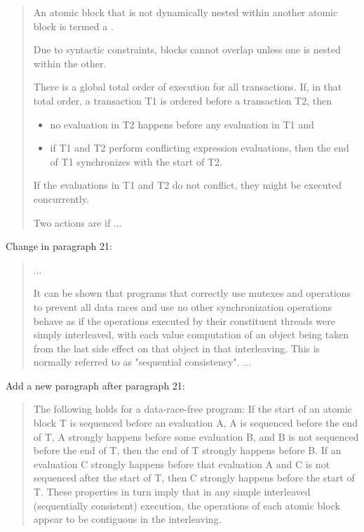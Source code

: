 \begin{quote}
\pnum
\setcounter{Paras}{20}
An atomic block that is not dynamically nested within another atomic
block is termed a .
\begin{note}
Due to syntactic constraints,
blocks cannot overlap unless one is nested within the other.
\end{note}
There is a global total order of execution for all transactions.
If, in that total order, a transaction T1 is ordered before a transaction T2,
then

\begin{itemize}
\item
  no evaluation in T2 happens before any evaluation in T1 and
\item
  if T1 and T2 perform conflicting expression evaluations, then the end
  of T1 synchronizes with the start of T2.
\end{itemize}

\begin{note}
If the evaluations in T1 and T2 do not conflict, they might be
executed concurrently.
\end{note}

\pnum
Two actions are  if ...
\end{quote}

Change in  paragraph 21:

\begin{quote}
\setcounter{Paras}{20}
\pnum
...
\begin{note}
It can be shown that programs that correctly use
mutexes and 
operations to prevent all data races and use no other synchronization
operations behave as if the operations executed by their constituent
threads were simply interleaved, with each value computation of an
object being taken from the last side effect on that object in that
interleaving. This is normally referred to as "sequential consistency".
...
\end{note}
\end{quote}

Add a new paragraph after  paragraph 21:

\begin{quote}
\setcounter{Paras}{21}
\pnum
\begin{note}
The following holds for a data-race-free program: If the start
of an atomic block T is sequenced before an evaluation A, A is sequenced
before the end of T, A strongly happens before some evaluation B, and B
is not sequenced before the end of T, then the end of T strongly happens
before B. If an evaluation C strongly happens before that evaluation A
and C is not sequenced after the start of T, then C strongly happens
before the start of T. These properties in turn imply that in any simple
interleaved (sequentially consistent) execution, the operations of each
atomic block appear to be contiguous in the interleaving.
\end{note}
\end{quote}

